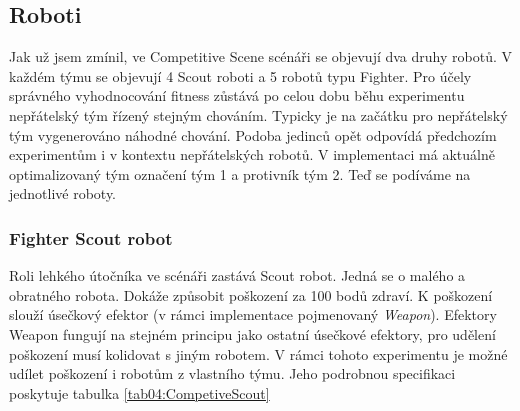 \subsection*{Roboti}
Jak už jsem zmínil, ve Competitive Scene scénáři se objevují dva druhy robotů. V každém týmu se objevují 4 Scout roboti a 5 robotů typu Fighter. Pro účely správného vyhodnocování fitness zůstává po celou dobu běhu experimentu nepřátelský tým řízený stejným chováním. Typicky je na začátku pro nepřátelský tým vygenerováno náhodné chování. Podoba jedinců opět odpovídá předchozím experimentům i v kontextu nepřátelských robotů. V implementaci má aktuálně optimalizovaný tým označení tým 1 a protivník tým 2. 
Teď se podíváme na jednotlivé roboty.
\subsubsection{Fighter Scout robot}
Roli lehkého útočníka ve scénáři zastává Scout robot. Jedná se o malého a obratného robota. Dokáže způsobit poškození za 100 bodů zdraví. K poškození slouží úsečkový efektor (v rámci implementace pojmenovaný \textit{Weapon}).  Efektory Weapon fungují na stejném principu jako ostatní úsečkové efektory, pro udělení poškození musí kolidovat s jiným robotem. V rámci tohoto experimentu je možné udílet poškození i robotům z vlastního týmu.  Jeho podrobnou specifikaci poskytuje tabulka \ref{tab04:CompetiveScout}
